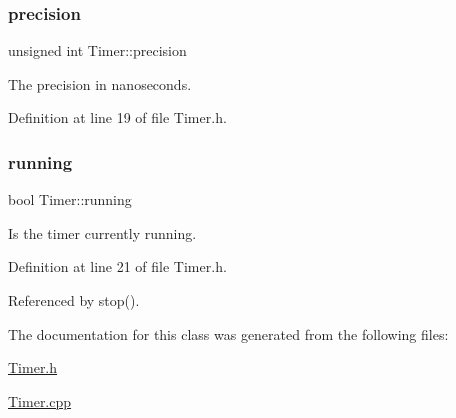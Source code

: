 \subsubsection{\texorpdfstring{precision}{precision}}
{\footnotesize\ttfamily unsigned int Timer\+::precision\hspace{0.3cm}{\ttfamily [private]}}



The precision in nanoseconds. 



Definition at line 19 of file Timer.\+h.

\mbox{\label{class_timer_a3b8bb57a0a252c88f85c0592715ea425}} 
\subsubsection{\texorpdfstring{running}{running}}
{\footnotesize\ttfamily bool Timer\+::running\hspace{0.3cm}{\ttfamily [private]}}



Is the timer currently running. 



Definition at line 21 of file Timer.\+h.



Referenced by stop().



The documentation for this class was generated from the following files\+:\begin{DoxyCompactItemize}
\item 
\hyperlink{_timer_8h}{Timer.\+h}\item 
\hyperlink{_timer_8cpp}{Timer.\+cpp}\end{DoxyCompactItemize}
